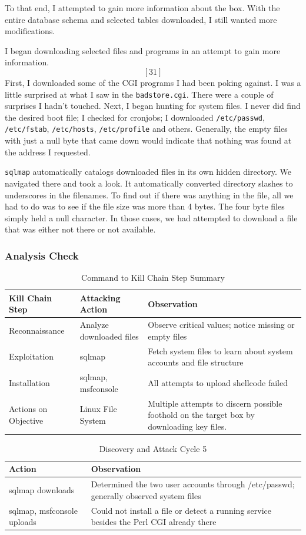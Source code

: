 To that end, I attempted to gain more information about the box. With the entire database schema and selected tables downloaded, I still wanted more modifications.  

I began downloading selected files and programs in an attempt to gain more information. \[[31]\] First, I downloaded some of the CGI programs I had been poking against.  I was a little surprised at what I saw in the \texttt{badstore.cgi}.  There were a couple of surprises I hadn't touched.  Next, I began hunting for system files.  I never did find the desired boot file; I checked for cronjobs; I downloaded \texttt{/etc/passwd}, \texttt{/etc/fstab}, \texttt{/etc/hosts}, \texttt{/etc/profile} and others.  Generally, the empty files with just a null byte that came down would indicate that nothing was found at the address I requested.

\texttt{sqlmap} automatically catalogs downloaded files in its own hidden directory.  We navigated there and took a look.  It automatically converted directory slashes to underscores in the filenames.  To find out if there was anything in the file, all we had to do was to see if the file size was more than 4 bytes.  The four byte files simply held a null character.  In those cases, we had attempted to download a file that was either not there or not available. 

\subsubsection{Analysis Check}
\begin{table}[H]
\caption{Command to Kill Chain Step Summary}
\centering
\begin{tabular}{|l|l|l|}
\hline
Kill Chain Step & Attacking Action & Observation \\
\hline
Reconnaissance & Analyze downloaded files & Observe critical values; notice missing or empty files \\
Exploitation & sqlmap & Fetch system files to learn about system accounts and file structure \\
Installation & sqlmap, msfconsole & All attempts to upload shellcode failed \\
Actions on Objective & Linux File System & Multiple attempts to discern possible foothold on the target box by downloading key files. \\
\hline
\end{tabular}
\end{table}

\begin{table}[H]
\caption{Discovery and Attack Cycle 5}
\centering
\begin{tabular}{|l|l|}
\hline
Action & Observation \\
\hline
sqlmap downloads & Determined the two user accounts through /etc/passwd; generally observed system files \\
sqlmap, msfconsole uploads & Could not install a file or detect a running service besides the Perl CGI already there \\
\hline
\end{tabular}
\end{table}


